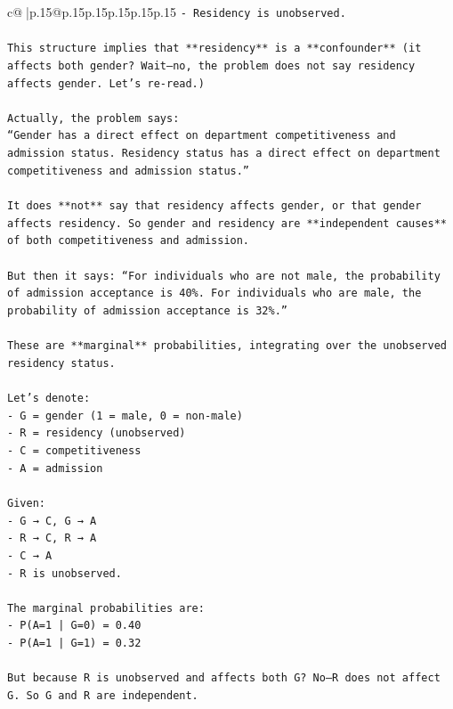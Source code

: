 \documentclass{article}
\begin{document}
{\begin{supertabular}{c@{$\;$}|p{.15\linewidth}@{}p{.15\linewidth}p{.15\linewidth}p{.15\linewidth}p{.15\linewidth}p{.15\linewidth}}
{{{\texttt{{-} Residency is unobserved.} \\
\\ 
\texttt{This structure implies that **residency** is a **confounder** (it affects both gender? Wait—no, the problem does not say residency affects gender. Let’s re{-}read.)} \\
\\ 
\texttt{Actually, the problem says:  } \\
\texttt{“Gender has a direct effect on department competitiveness and admission status. Residency status has a direct effect on department competitiveness and admission status.”  } \\
\\ 
\texttt{It does **not** say that residency affects gender, or that gender affects residency. So gender and residency are **independent causes** of both competitiveness and admission.} \\
\\ 
\texttt{But then it says: “For individuals who are not male, the probability of admission acceptance is 40\%. For individuals who are male, the probability of admission acceptance is 32\%.”} \\
\\ 
\texttt{These are **marginal** probabilities, integrating over the unobserved residency status.} \\
\\ 
\texttt{Let’s denote:} \\
\texttt{{-} G = gender (1 = male, 0 = non{-}male)} \\
\texttt{{-} R = residency (unobserved)} \\
\texttt{{-} C = competitiveness} \\
\texttt{{-} A = admission} \\
\\ 
\texttt{Given:} \\
\texttt{{-} G → C, G → A} \\
\texttt{{-} R → C, R → A} \\
\texttt{{-} C → A} \\
\texttt{{-} R is unobserved.} \\
\\ 
\texttt{The marginal probabilities are:} \\
\texttt{{-} P(A=1 | G=0) = 0.40} \\
\texttt{{-} P(A=1 | G=1) = 0.32} \\
\\ 
\texttt{But because R is unobserved and affects both G? No—R does not affect G. So G and R are independent.} \\
}}}
\end{supertabular}}
\end{document}
